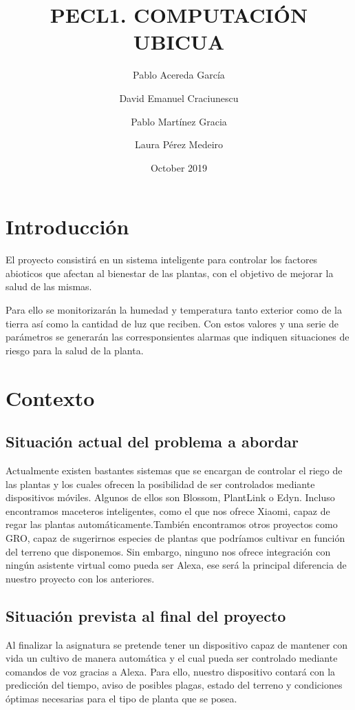 \documentclass[runningheads]{llncs}
\title{PECL1. COMPUTACIÓN UBICUA} %
\author{Pablo Acereda García \and David Emanuel Craciunescu \and Pablo Martínez Gracia \and Laura Pérez Medeiro }
\date{October 2019}
\begin{document}
\maketitle

\section{Introducción}
El proyecto consistirá en un sistema inteligente para controlar los factores abioticos que afectan al bienestar de las plantas, con el objetivo de mejorar la salud de las mismas.

Para ello se monitorizarán la humedad y temperatura tanto exterior como de la tierra así como la cantidad de luz que reciben. Con estos valores y una serie de parámetros se generarán las corresponsientes alarmas que indiquen situaciones de riesgo para la salud de la planta.

\section{Contexto}
    \subsection{Situación actual del problema a abordar}
    Actualmente existen bastantes sistemas que se encargan de controlar el riego de las plantas y los cuales ofrecen la posibilidad de ser controlados mediante dispositivos móviles. Algunos de ellos son Blossom, PlantLink o Edyn. Incluso encontramos maceteros inteligentes, como el que nos ofrece Xiaomi, capaz de regar las plantas automáticamente.También encontramos otros proyectos como GRO, capaz de sugerirnos especies de plantas que podríamos cultivar en función del terreno que disponemos.
    \newline
    Sin embargo, ninguno nos ofrece integración con ningún asistente virtual como pueda ser Alexa, ese será la principal diferencia de nuestro proyecto con los anteriores.
    
    \subsection{Situación prevista al final del proyecto}
    Al finalizar la asignatura se pretende tener un dispositivo capaz de mantener con vida un cultivo de manera automática y el cual pueda ser controlado mediante comandos de voz gracias a Alexa.
    Para ello, nuestro dispositivo contará con la predicción del tiempo, aviso de posibles plagas, estado del terreno y condiciones óptimas necesarias para el tipo de planta que se posea.
    
\end{document}
